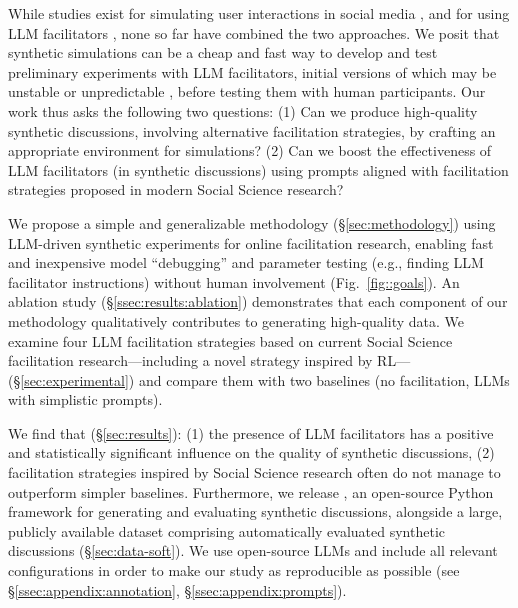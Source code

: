 While studies exist for simulating user interactions in social media \cite{park_simulacra, mou_2024, tornberg_2023, y_social, balog_2024}, and for using \ac{LLM} facilitators \cite{kim_et_al_chatbot, cho-etal-2024-language}, none so far have combined the two approaches. We posit that synthetic simulations can be a cheap and fast way to develop and test preliminary experiments with \ac{LLM} facilitators, initial versions of which may be unstable or unpredictable \cite{atil_2025, rossi_2024}, before testing them with human participants. Our work thus asks the following two questions: (1) Can we produce high-quality synthetic discussions, involving alternative facilitation strategies, by crafting an appropriate environment for simulations? (2) Can we boost the effectiveness of \ac{LLM} facilitators (in synthetic discussions) using prompts aligned with facilitation strategies proposed in modern Social Science research?

We propose a simple and generalizable methodology (\S\ref{sec:methodology}) using \ac{LLM}-driven synthetic experiments for online facilitation research, enabling fast and inexpensive model “debugging” and parameter testing (e.g., finding \ac{LLM} facilitator instructions) without human involvement (Fig.~\ref{fig::goals}). An ablation study (\S\ref{ssec:results:ablation}) demonstrates that each component of our methodology qualitatively contributes to generating high-quality data. We examine four \ac{LLM} facilitation strategies based on current Social Science facilitation research---including a novel strategy inspired by \ac{RL}---(\S\ref{sec:experimental}) and compare them with two baselines (no facilitation, \acp{LLM} with simplistic prompts).

We find that (\S\ref{sec:results}): (1) the presence of \ac{LLM} facilitators has a positive and statistically significant influence on the quality of synthetic discussions, (2) facilitation strategies inspired by Social Science research often do not manage to outperform simpler baselines.
Furthermore, we release \syndisco, an open-source Python framework for generating and evaluating synthetic discussions, alongside \vmd\datasetlink a large, publicly available dataset comprising automatically evaluated synthetic discussions (\S\ref{sec:data-soft}). 
We use open-source \acp{LLM} and include all relevant configurations in order to make our study as reproducible as possible (see \S\ref{ssec:appendix:annotation}, \S\ref{ssec:appendix:prompts}).